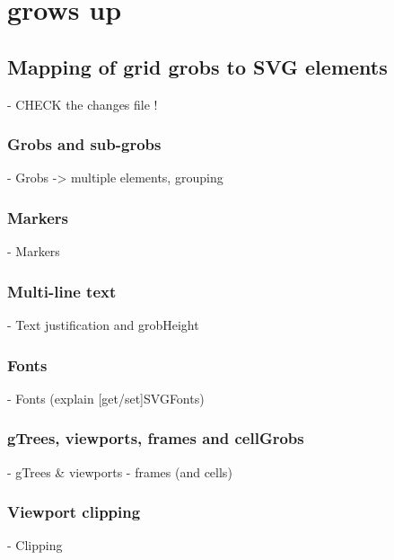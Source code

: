 \chapter{\gridSVG{} grows up}

\section{Mapping of grid grobs to SVG elements}

    - CHECK the changes file !

\subsection{Grobs and sub-grobs}

    - Grobs -> multiple elements, grouping

\subsection{Markers}
    - Markers

\subsection{Multi-line text}

    - Text justification and grobHeight

\subsection{Fonts}

    - Fonts (explain [get/set]SVGFonts)

\subsection{gTrees, viewports, frames and cellGrobs}
    - gTrees \& viewports
    - frames (and cells)

\subsection{Viewport clipping}
    - Clipping
